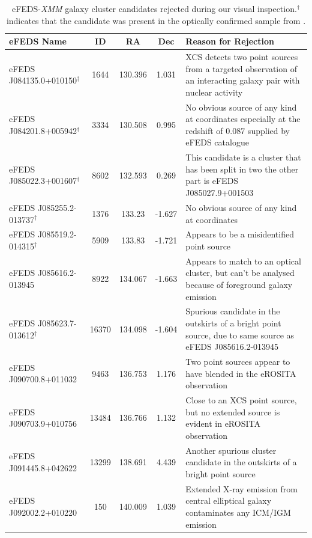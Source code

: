 \documentclass[fleqn,usenatbib]{mnras}
\begin{document}
\begin{table}
\begin{center}
\caption[]{{eFEDS-{\em XMM} galaxy cluster candidates rejected during our visual inspection.\newline $^\dagger$ indicates that the candidate was present in the optically confirmed sample from \cite{efedsclusteropticalcat}.}\label{tab:rejects}}
\vspace{1mm}
\begin{tabular}{lccc|l}
\hline
\hline
eFEDS Name & ID & RA & Dec & Reason for Rejection\\
\hline
\hline
eFEDS J084135.0+010150$^\dagger$ & 1644 & 130.396 & 1.031 & XCS detects two point sources from a targeted observation of an interacting galaxy pair with nuclear activity \\ 
\hline 
eFEDS J084201.8+005942$^\dagger$ & 3334 & 130.508 & 0.995 & No obvious source of any kind at coordinates especially at the redshift of 0.087 supplied by eFEDS catalogue \\ 
\hline
eFEDS J085022.3+001607$^\dagger$ & 8602 & 132.593 & 0.269 & This candidate is a cluster that has been split in two the other part is eFEDS J085027.9+001503 \\ 
\hline 
eFEDS J085255.2-013737$^\dagger$ & 1376 & 133.23 & -1.627 & No obvious source of any kind at coordinates \\
\hline 
eFEDS J085519.2-014315$^\dagger$ & 5909 & 133.83 & -1.721 & Appears to be a misidentified point source \\ 
\hline
eFEDS J085616.2-013945 & 8922 & 134.067 & -1.663 & Appears to match to an optical cluster, but can't be analysed because of foreground galaxy emission \\
\hline
eFEDS J085623.7-013612$^\dagger$ & 16370 & 134.098 & -1.604 & Spurious candidate in the outskirts of a bright point source, due to same source as eFEDS J085616.2-013945 \\ 
\hline 
eFEDS J090700.8+011032 & 9463 & 136.753 & 1.176 & Two point sources appear to have blended in the eROSITA observation \\
\hline 
eFEDS J090703.9+010756 & 13484 & 136.766 & 1.132 & Close to an XCS point source, but no extended source is evident in eROSITA observation \\ 
\hline 
eFEDS J091445.8+042622 & 13299 & 138.691 & 4.439 & Another spurious cluster candidate in the outskirts of a bright point source \\ 
\hline
eFEDS J092002.2+010220 & 150 & 140.009 & 1.039 & Extended X-ray emission from central elliptical galaxy contaminates any ICM/IGM emission \\

\end{tabular}
\end{center}
\end{table}
\end{document}
